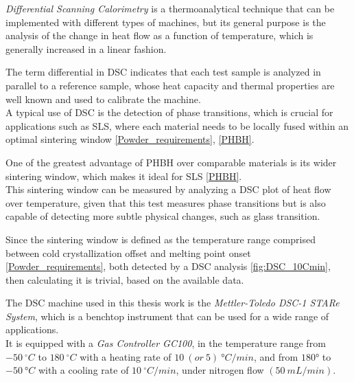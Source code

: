 \documentclass{article}
\begin{document}
            \textit{Differential Scanning Calorimetry} is a thermoanalytical technique that can be implemented with different types of machines, 
            but its general purpose is the analysis of the change in heat flow as a function of temperature, which is generally increased in 
            a linear fashion. 
        
            
            The term differential in DSC indicates that each test sample is analyzed in parallel to a reference sample, whose heat capacity and 
            thermal properties are well known and used to calibrate the machine. \\
            
            A typical use of DSC is the detection of phase transitions, which is crucial for applications such as SLS, where each material 
            needs to be locally fused within an optimal sintering window \ref{Powder_requirements}, \ref{PHBH}. 
    
            One of the greatest advantage of PHBH over comparable materials is its wider sintering window, which makes it ideal 
            for SLS \ref{PHBH}. \\ 
    
            This sintering window can be measured by analyzing a DSC plot of heat flow over temperature, given that this test measures 
            phase transitions but is also capable of detecting more subtle physical changes, such as glass transition. 
    
            Since the sintering window is defined as the temperature range comprised between cold crystallization offset and 
            melting point onset \ref{Powder_requirements}, both detected by a DSC analysis \ref{fig:DSC_10Cmin}, then calculating it is trivial, 
            based on the available data.

                The DSC machine used in this thesis work is the \textit{Mettler-Toledo DSC-1 STARe System}, which is a benchtop instrument that can be used for 
                a wide range of applications. \\ 

                It is equipped with a \textit{Gas Controller GC100}, in the temperature range from $-50 \ ^{\circ} C$ 
                to $180 \ ^{\circ} C$ with 
                a heating rate of $10 \ (or \ 5) \ °C/min$, and from $180°$ to $-50 \ °C$ with a cooling rate of $10  \ ^{\circ}C/min$, 
                under nitrogen flow $(50 \ mL/min)$. \\ 
\end{document}
